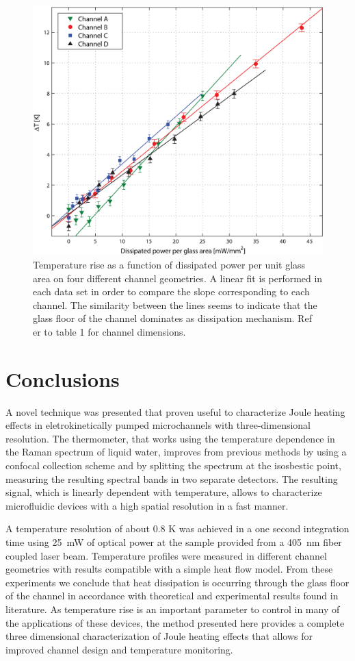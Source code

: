 \documentclass[twocolumn]{svjour3}       %
\begin{document}
\begin{figure}[h!]
\centering
\includegraphics[width=\columnwidth]{figs/rectas.eps}
\caption{Temperature rise as a function of dissipated power per unit glass area on four different channel geometries. A linear fit is performed in each data set in order to compare the slope corresponding to each channel. The similarity between the lines seems to indicate that the glass floor of the channel dominates as dissipation mechanism. Ref er to table 1 for channel dimensions.\label{fig:rectas}}
\end{figure}

\section{Conclusions}

A novel technique was presented that proven useful to characterize Joule heating effects in eletrokinetically pumped microchannels with three-dimensional resolution. The thermometer, that works using the temperature dependence in the Raman spectrum of liquid water, improves from previous methods by using a confocal collection scheme and by splitting the spectrum at the isosbestic point, measuring the resulting spectral bands in two separate detectors. The resulting signal, which is linearly dependent with temperature, allows to characterize microfluidic devices with a high spatial resolution in a fast manner. 

 A temperature resolution of about 0.8 K was achieved in a one second integration time using 25~mW of optical power at the sample provided from a 405~nm fiber coupled laser beam. Temperature profiles were measured in different channel geometries with results compatible with a simple heat flow model. From these experiments we conclude that heat dissipation is occurring through the glass floor of the channel in accordance with theoretical and experimental results found in literature. As temperature rise is an important parameter to control in many of the applications of these devices, the method presented here provides a complete three dimensional characterization of Joule heating effects that allows for improved channel design and temperature monitoring.
\end{document}

